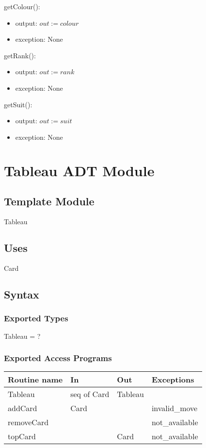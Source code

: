 \documentclass[12pt]{article}
\begin{document}
\noindent getColour():
\begin{itemize}
\item output: $out := colour$
\item exception: None
\end{itemize}

\noindent getRank():
\begin{itemize}
\item output: $out := rank$
\item exception: None
\end{itemize}

\noindent getSuit():
\begin{itemize}
\item output: $out := suit$
\item exception: None
\end{itemize}


\newpage

\section* {Tableau ADT Module}

\subsection*{Template Module}

Tableau

\subsection* {Uses}

Card

\subsection* {Syntax}

\subsubsection* {Exported Types}

Tableau = ?

\subsubsection* {Exported Access Programs}

\begin{tabular}{| l | l | l | l |}
\hline
\textbf{Routine name} & \textbf{In} & \textbf{Out} & \textbf{Exceptions}\\
\hline
Tableau & seq of Card & Tableau & \\
\hline
addCard & Card & ~ & invalid\_move\\
\hline
removeCard & ~ & ~ & not\_available\\
\hline
topCard & ~ & Card & not\_available\\
\hline
\end{tabular}
\end{document}
